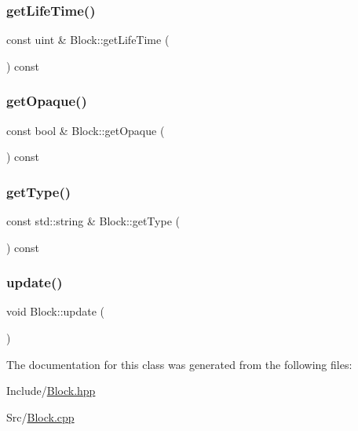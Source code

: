 \mbox{\label{class_block_a5a18d5cda3145dccef9aab2a73f91bdb}} 
\subsubsection{\texorpdfstring{getLifeTime()}{getLifeTime()}}
{\footnotesize\ttfamily const uint \& Block\+::get\+Life\+Time (\begin{DoxyParamCaption}{ }\end{DoxyParamCaption}) const}

\mbox{\label{class_block_a1023c8ec2f327f522fd47061c0cda6e1}} 
\subsubsection{\texorpdfstring{getOpaque()}{getOpaque()}}
{\footnotesize\ttfamily const bool \& Block\+::get\+Opaque (\begin{DoxyParamCaption}{ }\end{DoxyParamCaption}) const}

\mbox{\label{class_block_a5f2895baf07a0bb6f0c7c391b98dd9e4}} 
\subsubsection{\texorpdfstring{getType()}{getType()}}
{\footnotesize\ttfamily const std\+::string \& Block\+::get\+Type (\begin{DoxyParamCaption}{ }\end{DoxyParamCaption}) const}

\mbox{\label{class_block_a10e17f44df4d273c16190732197578f2}} 
\subsubsection{\texorpdfstring{update()}{update()}}
{\footnotesize\ttfamily void Block\+::update (\begin{DoxyParamCaption}{ }\end{DoxyParamCaption})}



The documentation for this class was generated from the following files\+:\begin{DoxyCompactItemize}
\item 
Include/\mbox{\hyperlink{_block_8hpp}{Block.\+hpp}}\item 
Src/\mbox{\hyperlink{_block_8cpp}{Block.\+cpp}}\end{DoxyCompactItemize}
